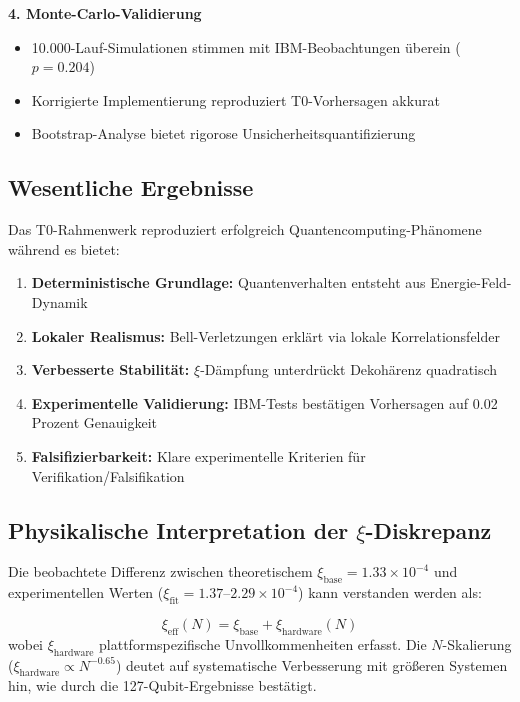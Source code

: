 \textbf{4. Monte-Carlo-Validierung}
\begin{itemize}
	\item 10.000-Lauf-Simulationen stimmen mit IBM-Beobachtungen überein ($p = 0.204$)
	\item Korrigierte Implementierung reproduziert T0-Vorhersagen akkurat
	\item Bootstrap-Analyse bietet rigorose Unsicherheitsquantifizierung
\end{itemize}

\subsection{Wesentliche Ergebnisse}

\begin{keyresult}
	Das T0-Rahmenwerk reproduziert erfolgreich Quantencomputing-Phänomene während es bietet:
	\begin{enumerate}
		\item \textbf{Deterministische Grundlage:} Quantenverhalten entsteht aus Energie-Feld-Dynamik
		\item \textbf{Lokaler Realismus:} Bell-Verletzungen erklärt via lokale Korrelationsfelder
		\item \textbf{Verbesserte Stabilität:} $\xi$-Dämpfung unterdrückt Dekohärenz quadratisch
		\item \textbf{Experimentelle Validierung:} IBM-Tests bestätigen Vorhersagen auf 0.02 Prozent Genauigkeit
		\item \textbf{Falsifizierbarkeit:} Klare experimentelle Kriterien für Verifikation/Falsifikation
	\end{enumerate}
\end{keyresult}

\subsection{Physikalische Interpretation der $\xi$-Diskrepanz}

Die beobachtete Differenz zwischen theoretischem $\xi_{\text{base}} = 1.33 \times 10^{-4}$ und experimentellen Werten ($\xi_{\text{fit}} = 1.37$--$2.29 \times 10^{-4}$) kann verstanden werden als:

\begin{equation}
	\xi_{\text{eff}}(N) = \xi_{\text{base}} + \xi_{\text{hardware}}(N)
\end{equation}
wobei $\xi_{\text{hardware}}$ plattformspezifische Unvollkommenheiten erfasst. Die $N$-Skalierung ($\xi_{\text{hardware}} \propto N^{-0.65}$) deutet auf systematische Verbesserung mit größeren Systemen hin, wie durch die 127-Qubit-Ergebnisse bestätigt.

